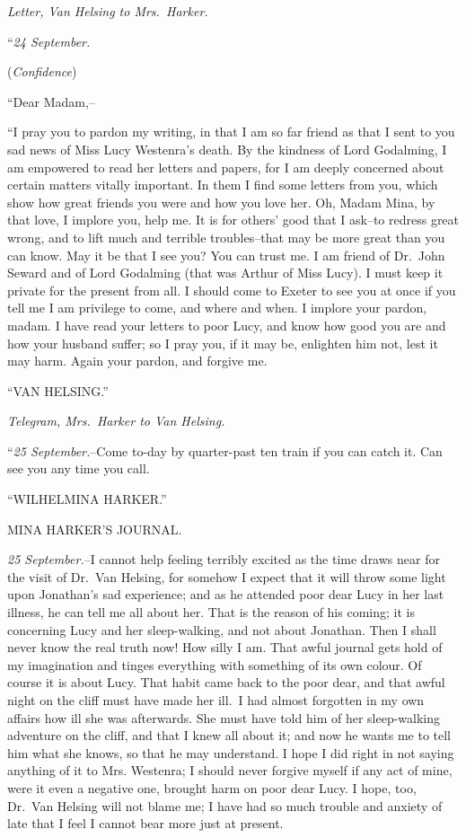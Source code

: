 \documentclass[12pt,openright]{book}
\begin{document}
\textit{Letter, Van Helsing to Mrs. Harker.}

“\textit{24 September.}

(\textit{Confidence})

“Dear Madam,–

“I pray you to pardon my writing, in that I am so far friend as that I sent to you sad news of Miss Lucy Westenra’s death. By the kindness of Lord Godalming, I am empowered to read her letters and papers, for I am deeply concerned about certain matters vitally important. In them I find some letters from you, which show how great friends you were and how you love her. Oh, Madam Mina, by that love, I implore you, help me. It is for others’ good that I ask–to redress great wrong, and to lift much and terrible troubles–that may be more great than you can know. May it be that I see you? You can trust me. I am friend of Dr. John Seward and of Lord Godalming (that was Arthur of Miss Lucy). I must keep it private for the present from all. I should come to Exeter to see you at once if you tell me I am privilege to come, and where and when. I implore your pardon, madam. I have read your letters to poor Lucy, and know how good you are and how your husband suffer; so I pray you, if it may be, enlighten him not, lest it may harm. Again your pardon, and forgive me.

“VAN HELSING.”

\textit{Telegram, Mrs. Harker to Van Helsing.}

“\textit{25 September.}–Come to-day by quarter-past ten train if you can catch it. Can see you any time you call.

“WILHELMINA HARKER.”

MINA HARKER’S JOURNAL.

\textit{25 September.}–I cannot help feeling terribly excited as the time draws near for the visit of Dr. Van Helsing, for somehow I expect that it will throw some light upon Jonathan’s sad experience; and as he attended poor dear Lucy in her last illness, he can tell me all about her. That is the reason of his coming; it is concerning Lucy and her sleep-walking, and not about Jonathan. Then I shall never know the real truth now! How silly I am. That awful journal gets hold of my imagination and tinges everything with something of its own colour. Of course it is about Lucy. That habit came back to the poor dear, and that awful night on the cliff must have made her ill. I had almost forgotten in my own affairs how ill she was afterwards. She must have told him of her sleep-walking adventure on the cliff, and that I knew all about it; and now he wants me to tell him what she knows, so that he may understand. I hope I did right in not saying anything of it to Mrs. Westenra; I should never forgive myself if any act of mine, were it even a negative one, brought harm on poor dear Lucy. I hope, too, Dr. Van Helsing will not blame me; I have had so much trouble and anxiety of late that I feel I cannot bear more just at present.
\end{document}

